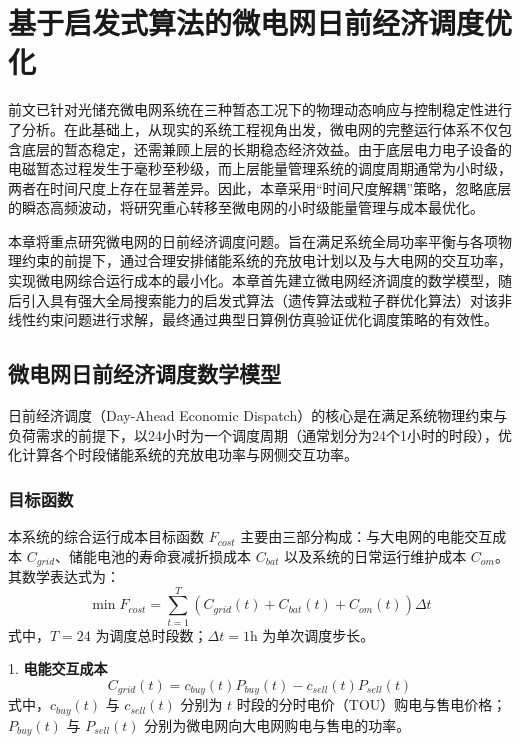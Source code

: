 \section{基于启发式算法的微电网日前经济调度优化}
\label{sec:economic_dispatch}

前文已针对光储充微电网系统在三种暂态工况下的物理动态响应与控制稳定性进行了分析。在此基础上，从现实的系统工程视角出发，微电网的完整运行体系不仅包含底层的暂态稳定，还需兼顾上层的长期稳态经济效益。由于底层电力电子设备的电磁暂态过程发生于毫秒至秒级，而上层能量管理系统的调度周期通常为小时级，两者在时间尺度上存在显著差异。因此，本章采用“时间尺度解耦”策略，忽略底层的瞬态高频波动，将研究重心转移至微电网的小时级能量管理与成本最优化。

本章将重点研究微电网的日前经济调度问题。旨在满足系统全局功率平衡与各项物理约束的前提下，通过合理安排储能系统的充放电计划以及与大电网的交互功率，实现微电网综合运行成本的最小化。本章首先建立微电网经济调度的数学模型，随后引入具有强大全局搜索能力的启发式算法（遗传算法或粒子群优化算法）对该非线性约束问题进行求解，最终通过典型日算例仿真验证优化调度策略的有效性。

\subsection{微电网日前经济调度数学模型}
\label{sec:math_model}

日前经济调度（Day-Ahead Economic Dispatch）的核心是在满足系统物理约束与负荷需求的前提下，以24小时为一个调度周期（通常划分为24个1小时的时段），优化计算各个时段储能系统的充放电功率与网侧交互功率。

\subsubsection{目标函数}
本系统的综合运行成本目标函数 $F_{cost}$ 主要由三部分构成：与大电网的电能交互成本 $C_{grid}$、储能电池的寿命衰减折损成本 $C_{bat}$ 以及系统的日常运行维护成本 $C_{om}$。其数学表达式为：
\begin{equation}
    \min F_{cost} = \sum_{t=1}^{T} \left( C_{grid}(t) + C_{bat}(t) + C_{om}(t) \right) \Delta t
\end{equation}
式中，$T=24$ 为调度总时段数；$\Delta t=1\text{h}$ 为单次调度步长。

1. \textbf{电能交互成本}
\begin{equation}
    C_{grid}(t) = c_{buy}(t) P_{buy}(t) - c_{sell}(t) P_{sell}(t)
\end{equation}
式中，$c_{buy}(t)$ 与 $c_{sell}(t)$ 分别为 $t$ 时段的分时电价（TOU）购电与售电价格；$P_{buy}(t)$ 与 $P_{sell}(t)$ 分别为微电网向大电网购电与售电的功率。

